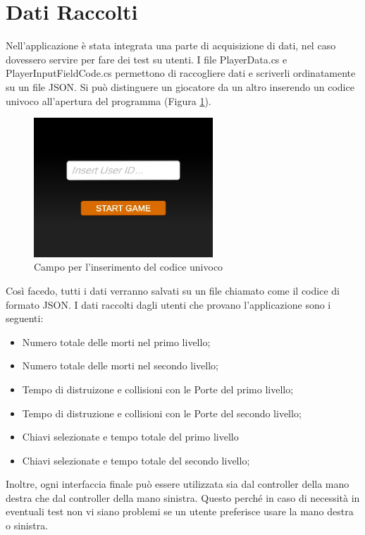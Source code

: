 \documentclass[target=bach,aauheader=]{thud}
\begin{document}
\section{Dati Raccolti}
\label{data}
Nell'applicazione è stata integrata una parte di acquisizione di dati, nel caso dovessero servire per fare dei test su utenti.
I file PlayerData.cs e PlayerInputFieldCode.cs permettono di raccogliere dati e scriverli ordinatamente su un file JSON.
Si può distinguere un giocatore da un altro inserendo un codice univoco all'apertura del programma (Figura \ref{fig:cod}).

\begin{figure}[h]
    \centering
    \includegraphics[width=0.60\textwidth]{cod}
    \caption{Campo per l'inserimento del codice univoco}
    \label{fig:cod}
\end{figure}

Così facedo, tutti i dati verranno salvati su un file chiamato come il codice di formato JSON.
I dati raccolti dagli utenti che provano l'applicazione sono i seguenti:
\begin{itemize}
    \item Numero totale delle morti nel primo livello;
    \item Numero totale delle morti nel secondo livello;
    \item Tempo di distruizone e collisioni con le Porte del primo livello;
    \item Tempo di distruzione e collisioni con le Porte del secondo livello;
    \item Chiavi selezionate e tempo totale del primo livello
    \item Chiavi selezionate e tempo totale del secondo livello;
\end{itemize}

Inoltre, ogni interfaccia finale può essere utilizzata sia dal controller della mano destra che dal controller della mano sinistra.
Questo perché in caso di necessità in eventuali test non vi siano problemi se un utente preferisce usare la mano destra o sinistra.
\end{document}
